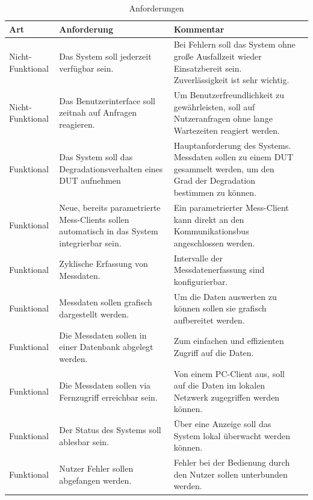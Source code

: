 \begin{table}[H]
\begin{center}
\begin{tabularx}{\textwidth}{|p{3cm}|X|X|X|}\hline
Art & Anforderung & Kommentar \\ \hline
Nicht-Funktional & Das System soll jederzeit verfügbar sein. & Bei Fehlern soll das System ohne große Ausfallzeit wieder Einsatzbereit sein. Zuverlässigkeit ist sehr wichtig.\\ \hline
Nicht-Funktional & Das Benutzerinterface soll zeitnah auf Anfragen reagieren. & Um Benutzerfreundlichkeit zu gewährleisten, soll auf Nutzeranfragen ohne lange Wartezeiten reagiert werden. \\ \hline
Funktional & Das System soll das Degradationsverhalten eines \ac{DUT} aufnehmen & Hauptanforderung des Systems. Messdaten sollen zu einem \ac{DUT} gesammelt werden, um den Grad der Degradation bestimmen zu können. \\ \hline
Funktional & Neue, bereits parametrierte Mess-Clients sollen automatisch in das System integrierbar sein. & Ein parametrierter Mess-Client kann direkt an den Kommunikationsbus angeschlossen werden.\\ \hline
Funktional & Zyklische Erfassung von Messdaten. & Intervalle der Messdatenerfassung sind konfigurierbar.\\ \hline
Funktional & Messdaten sollen grafisch dargestellt werden. & Um die Daten auswerten zu können sollen sie grafisch aufbereitet werden.\\ \hline
Funktional & Die Messdaten sollen in einer Datenbank abgelegt werden. & Zum einfachen und effizienten Zugriff auf die Daten.\\ \hline
Funktional & Die Messdaten sollen via Fernzugriff erreichbar sein. & Von einem PC-Client aus, soll auf die Daten im lokalen Netzwerk zugegriffen werden können.\\ \hline
Funktional & Der Status des Systems soll ablesbar sein. & Über eine Anzeige soll das System lokal überwacht werden können.\\ \hline
Funktional & Nutzer Fehler sollen abgefangen werden. & Fehler bei der Bedienung durch den Nutzer sollen unterbunden werden.\\ \hline
\end{tabularx}
\caption{Anforderungen}
\label{table_Anforderungen}
\end{center}
\end{table}








